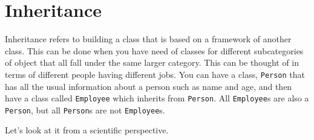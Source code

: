 \section{Inheritance}
Inheritance refers to building a class that is based on a framework of
another class. This can be done when you have need of classes for
different subcategories of object that all fall under the same larger
category. This can be thought of in terms of different people having
different jobs. You can have a class, \texttt{Person} that has all the
usual information about a person such as name and age, and then have a
class called \texttt{Employee} which inherits from \texttt{Person}. All
\texttt{Employee}s are also a \texttt{Person}, but all \texttt{Person}s
are not \texttt{Employee}s.

Let's look at it from a scientific perspective.


